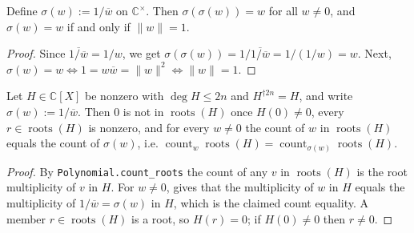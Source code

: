 \begin{lemma}
    \label{lem:circle-involution}
    \leanok
    Define $\sigma(w) := 1/\overline{w}$ on $\mathbb{C}^{\times}$. Then
    $\sigma(\sigma(w)) = w$ for all $w \neq 0$, and $\sigma(w) = w$ if and only if
    $\|w\| = 1$.
\end{lemma}
\begin{proof}
    Since $\overline{1/\overline{w}} = 1/w$, we get
    $\sigma(\sigma(w)) = 1/\overline{1/\overline{w}} = 1/(1/w) = w$. Next,
    $\sigma(w) = w \iff 1 = w\overline{w} = \|w\|^2 \iff \|w\| = 1$.
\end{proof}

\begin{lemma}
    \label{lem:fr-build-S-root-pairing}
    \leanok
    Let $H \in \mathbb{C}[X]$ be nonzero with $\deg H \le 2n$ and
    $H^{\dagger 2n} = H$, and write $\sigma(w) := 1/\overline{w}$. Then $0$ is
    not in $\operatorname{roots}(H)$ once $H(0) \neq 0$, every $r \in
    \operatorname{roots}(H)$ is nonzero, and for every $w \neq 0$ the count of $w$
    in $\operatorname{roots}(H)$ equals the count of $\sigma(w)$, i.e.
    $\operatorname{count}_w\operatorname{roots}(H)
    = \operatorname{count}_{\sigma(w)}\operatorname{roots}(H)$.
\end{lemma}
\begin{proof}
    By \texttt{Polynomial.count\_roots} the count of any $v$ in
    $\operatorname{roots}(H)$ is the root multiplicity of $v$ in $H$. For
    $w \neq 0$,  gives that the multiplicity of
    $w$ in $H$ equals the multiplicity of $1/\overline{w} = \sigma(w)$ in $H$,
    which is the claimed count equality. A member $r \in \operatorname{roots}(H)$
    is a root, so $H(r) = 0$; if $H(0) \neq 0$ then $r \neq 0$.
\end{proof}

